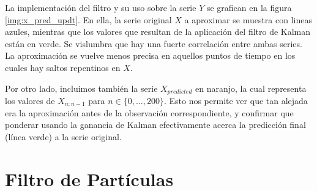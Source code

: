 \documentclass[letterpaper,11pt,oneside]{article}
\begin{document}

La implementación del filtro y su uso sobre la serie $Y$ se grafican en la figura \ref{img:x_pred_updt}. En ella, la serie original $X$ a aproximar se muestra con lineas azules, mientras que los valores que resultan de la aplicación del filtro de Kalman están en verde. Se vislumbra que hay una fuerte correlación entre ambas series. La aproximación se vuelve menos precisa en aquellos puntos de tiempo en los cuales hay saltos repentinos en $X$.

Por otro lado, incluimos también la serie $X_{predicted}$ en naranjo, la cual representa los valores de $X_{n:n-1}$ para $n\in\{0,\dots,200\}$. Esto nos permite ver que tan alejada era la aproximación antes de la observación correspondiente, y confirmar que ponderar usando la ganancia de Kalman efectivamente acerca la predicción final (línea verde) a la serie original.


\section{Filtro de Partículas}

\lipsum[1]


\lipsum[2]


\lipsum[3]


\end{document}
